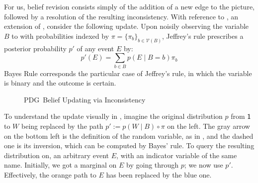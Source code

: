 \documentclass{article}
\def\sheq{\!=\!}
\newcommand{\V}{\mathcal V}
\newcommand{\MN}{PDG}
\numberwithin{equation}{section}
\begin{document}
\begin{notfocus}
	For us, belief revision consists simply of the addition of a new edge to the picture, followed by a resolution of the resulting inconsistency. 
	With reference to , an extension of , consider the following update. 
	Upon noisily observing the variable $B$ to with probabilities indexed by $\pi = \{\pi_b\}_{b \in \V(B)}$, Jeffrey's rule prescribes a posterior probability $p'$ of any event $E$ by:
	\[ p'(E) = \sum_{b \in B} p(E \mid B\sheq b) \pi_b \]
	Bayes Rule corresponds the particular case of Jeffrey's rule, in which the variable is binary and the outcome is certain.

	
	\begin{figure}[h]
		\centering
%				
%				
		\caption{\MN\ Belief Updating via Inconsistency}
		\label{fig:belief-update}
	\end{figure}
	
	To understand the update visually in , imagine the original distribution $p$ from $\sf 1$ to $W$ being replaced by the path $p' := p(W \mid B) \circ \pi$  on the left. The gray arrow on the bottom left is the definition of the random variable, as in , and the dashed one is its inversion, which can be computed by Bayes' rule.  %
	To query the resulting distribution on, an arbitrary event $E$, with an indicator variable of the same name. Initially, we got a marginal on $E$ by going through $p$; we now use $p'$. Effectively, the orange path to $E$ has been replaced by the blue one.


\end{notfocus}
\end{document}
